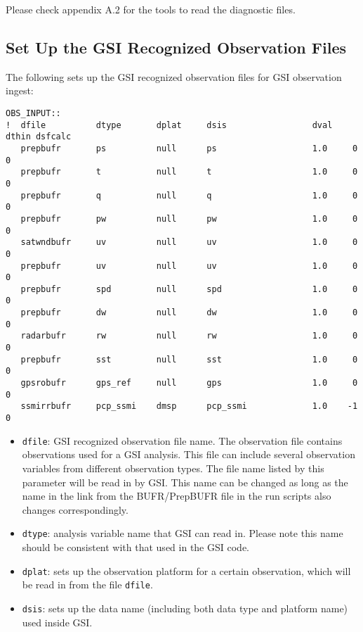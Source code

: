 Please check appendix A.2 for the tools to read the diagnostic files.

\subsection{Set Up the GSI Recognized Observation Files}

The following sets up the GSI recognized observation files for GSI observation ingest:

\begin{scriptsize}
\begin{verbatim}
OBS_INPUT::
!  dfile          dtype       dplat     dsis                 dval    dthin dsfcalc
   prepbufr       ps          null      ps                   1.0     0     0
   prepbufr       t           null      t                    1.0     0     0
   prepbufr       q           null      q                    1.0     0     0
   prepbufr       pw          null      pw                   1.0     0     0
   satwndbufr     uv          null      uv                   1.0     0     0
   prepbufr       uv          null      uv                   1.0     0     0
   prepbufr       spd         null      spd                  1.0     0     0
   prepbufr       dw          null      dw                   1.0     0     0
   radarbufr      rw          null      rw                   1.0     0     0
   prepbufr       sst         null      sst                  1.0     0     0
   gpsrobufr      gps_ref     null      gps                  1.0     0     0
   ssmirrbufr     pcp_ssmi    dmsp      pcp_ssmi             1.0    -1     0
\end{verbatim}
\end{scriptsize}

\begin{itemize}
\item \verb|dfile|: GSI recognized observation file name. The observation file contains observations used for a GSI analysis. This file can include several observation variables from different observation types. The file name listed by this parameter will be read in by GSI. This name can be changed as long as the name in the link from the BUFR/PrepBUFR file in the run scripts also changes correspondingly.
\item \verb|dtype|: analysis variable name that GSI can read in. Please note this name should be consistent with that used in the GSI code. 
\item \verb|dplat|: sets up the observation platform for a certain observation, which will be read in from the file \verb|dfile|.
\item \verb|dsis|: sets up the data name (including both data type and platform name) used inside GSI.
\end{itemize}

